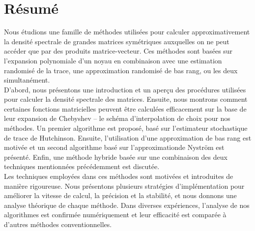 \chapter*{Résumé}
\label{chp:0-resume}

Nous étudions une famille de méthodes utilisées pour calculer approximativement
la densité spectrale de grandes matrices symétriques auxquelles on ne peut accéder
que par des produits matrice-vecteur. Ces méthodes sont basées sur l'expansion
polynomiale d'un noyau en combinaison avec une estimation randomisé
de la trace, une approximation randomisé de bas rang, ou les deux simultanément.\\

D'abord, nous présentons une introduction et un aperçu des procédures
utilisées pour calculer la densité spectrale des matrices. Ensuite, nous montrons
comment certaines fonctions matricielles peuvent être calculées efficacement sur
la base de leur expansion de Chebyshev -- le schéma d'interpolation de choix pour
nos méthodes. Un premier algorithme est proposé, basé sur l'estimateur stochastique
de trace de Hutchinson. Ensuite, l'utilisation d'une approximation de bas rang
est motivée et un second algorithme basé sur l'approximationde Nystr\"om est présenté.
Enfin, une méthode hybride basée sur une combinaison des deux techniques mentionnées
précédemment est discutée.\\

Les techniques employées dans ces méthodes sont motivées et introduites de manière
rigoureuse. Nous présentons plusieurs stratégies d'implémentation pour améliorer
la vitesse de calcul, la précision et la stabilité, et nous donnons une analyse
théorique de chaque méthode. Dans diverses expériences, l'analyse de nos algorithmes
est confirmée numériquement et leur efficacité est comparée à d'autres méthodes
conventionnelles.
